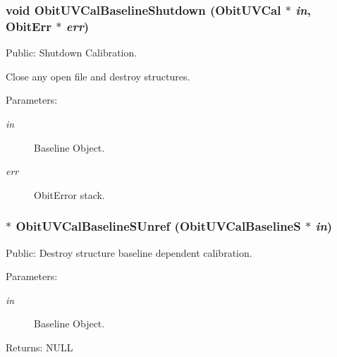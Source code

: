 \subsubsection{\setlength{\rightskip}{0pt plus 5cm}void Obit\-UVCal\-Baseline\-Shutdown ({\bf Obit\-UVCal} $\ast$ {\em in}, {\bf Obit\-Err} $\ast$ {\em err})}\label{ObitUVCalBaseline_8h_a2}


Public: Shutdown Calibration. 

Close any open file and destroy structures. \begin{Desc}
\item[Parameters:]
\begin{description}
\item[{\em in}]Baseline Object. \item[{\em err}]Obit\-Error stack. \end{description}
\end{Desc}
\subsubsection{$\ast$ Obit\-UVCal\-Baseline\-SUnref ({\bf Obit\-UVCal\-Baseline\-S} $\ast$ {\em in})}\label{ObitUVCalBaseline_8h_a3}


Public: Destroy structure baseline dependent calibration. 

\begin{Desc}
\item[Parameters:]
\begin{description}
\item[{\em in}]Baseline Object. \end{description}
\end{Desc}
\begin{Desc}
\item[Returns:]NULL \end{Desc}
